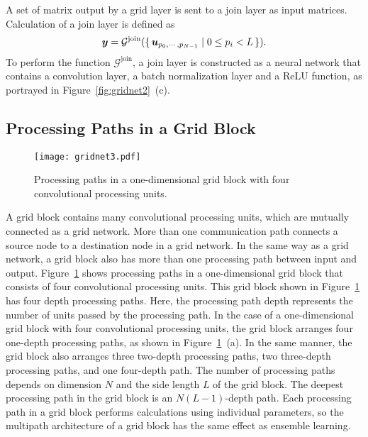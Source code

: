 \documentclass[10pt,twocolumn,letterpaper]{article}
\begin{document}
A set of matrix output by a grid layer is sent to a join layer as input matrices.
Calculation of a join layer is defined as
\begin{eqnarray}{\bm y} = \mathcal{G}^{\textrm{join}}(\set{{\bm u}_{p_0,\cdots,p_{N-1}} \mid 0 \leq p_i < L}).
\end{eqnarray}
To perform the function $\mathcal{G}^{\textrm{join}}$, a join layer is constructed as a neural network that contains a convolution layer, a batch normalization layer and a ReLU function, as portrayed in Figure~\ref{fig:gridnet2}~(c).

\subsection{Processing Paths in a Grid Block}
\label{subsec:path}

\begin{figure}
\centering
 \texttt{[image: gridnet3.pdf]}
 \caption{Processing paths in a one-dimensional grid block with four convolutional processing units.}
 \label{fig:gridnet3}
\end{figure}

A grid block contains many convolutional processing units, which are mutually connected as a grid network.
More than one communication path connects a source node to a destination node in a grid network.
In the same way as a grid network, a grid block also has more than one processing path between input and output.
Figure~\ref{fig:gridnet3} shows processing paths in a one-dimensional grid block that consists of four convolutional processing units.
This grid block shown in Figure~\ref{fig:gridnet3} has four depth processing paths.
Here, the processing path depth represents the number of units passed by the processing path.
In the case of a one-dimensional grid block with four convolutional processing units,
the grid block arranges four one-depth processing paths, as shown in Figure~\ref{fig:gridnet3}~(a).
In the same manner, the grid block also arranges three two-depth processing paths, two three-depth processing paths, and one four-depth path.
The number of processing paths depends on dimension $N$ and the side length $L$ of the grid block.
The deepest processing path in the grid block is an $N(L-1)$-depth path.
Each processing path in a grid block performs calculations using individual parameters,
so the multipath architecture of a grid block has the same effect as ensemble learning.
\end{document}
